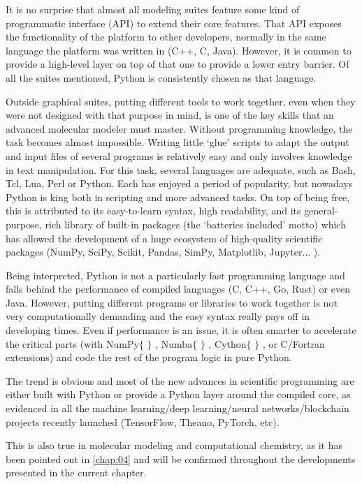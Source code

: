 It is no surprise that almost all modeling suites feature some kind of programmatic interface (API) to extend their core features. That API exposes the functionality of the platform to other developers, normally in the same language the platform was written in (C++, C, Java). However, it is common to provide a high-level layer on top of that one to provide a lower entry barrier. Of all the suites mentioned, Python is consistently chosen as that language.

Outside graphical suites, putting different tools to work together, even when they were not designed with that purpose in mind, is one of the key skills that an advanced molecular modeler must master. Without programming knowledge, the task becomes almost impossible. Writing little ‘glue’ scripts to adapt the output and input files of several programs is relatively easy and only involves knowledge in text manipulation. For this task, several languages are adequate, such as Bash, Tcl, Lua, Perl or Python. Each has enjoyed a period of popularity, but nowadays Python is king both in scripting and more advanced tasks. On top of being free, this is attributed to its easy-to-learn syntax, high readability, and its general-purpose, rich library of built-in packages (the ‘batteries included’ motto) which has allowed the development of a huge ecosystem of high-quality scientific packages (NumPy, SciPy, Scikit, Pandas, SimPy, Matplotlib, Jupyter$ \ldots $ ).

Being interpreted, Python is not a particularly fast programming language and falls behind the performance of compiled languages (C, C++, Go, Rust) or even Java. However, putting different programs or libraries to work together is not very computationally demanding and the easy syntax really pays off in developing times. Even if performance is an issue, it is often smarter to accelerate the critical parts (with NumPy$ \{ $ $ \} $ , Numba$ \{ $ $ \} $ , Cython$ \{ $ $ \} $ , or C/Fortran extensions) and code the rest of the program logic in pure Python.

The trend is obvious and most of the new advances in scientific programming are either built with Python or provide a Python layer around the compiled core, as evidenced in all the machine learning/deep learning/neural networks/blockchain projects recently launched (TensorFlow, Theano, PyTorch, etc).

This is also true in molecular modeling and computational chemistry, as it has been pointed out in \autoref{chap:04} and will be confirmed throughout the developments presented in the current chapter.

